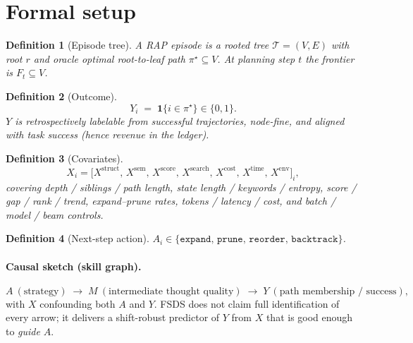 \documentclass[11pt]{article}
\newtheorem{definition}{Definition}
\newcommand{\ind}{\mathbf{1}}
\begin{document}
\section{Formal setup}
\label{sec:formal}

\begin{definition}[Episode tree]
A RAP episode is a rooted tree $\mathcal{T}=(V,E)$ with root $r$ and
oracle optimal root-to-leaf path $\pi^\star\subseteq V$.
At planning step $t$ the frontier is $F_t\subseteq V$.
\end{definition}

\begin{definition}[Outcome]
\begin{equation}
  Y_i \;=\; \ind\{i\in\pi^\star\}\in\{0,1\}.
  \label{eq:Y}
\end{equation}
$Y$ is retrospectively labelable from successful trajectories, node-fine,
and aligned with task success (hence revenue in the ledger).
\end{definition}

\begin{definition}[Covariates]
\begin{equation}
  X_i=\bigl[
    X^{\mathrm{struct}},\,
    X^{\mathrm{sem}},\,
    X^{\mathrm{score}},\,
    X^{\mathrm{search}},\,
    X^{\mathrm{cost}},\,
    X^{\mathrm{time}},\,
    X^{\mathrm{env}}
  \bigr]_i,
\end{equation}
covering depth / siblings / path length, state length / keywords /
entropy, score / gap / rank / trend, expand--prune rates, tokens /
latency / cost, and batch / model / beam controls.
\end{definition}

\begin{definition}[Next-step action]
$A_i\in\{\texttt{expand},\,\texttt{prune},\,\texttt{reorder},\,\texttt{backtrack}\}$.
\end{definition}

\paragraph{Causal sketch (skill graph).}
\[
  A\ (\text{strategy})
  \;\to\;
  M\ (\text{intermediate thought quality})
  \;\to\;
  Y\ (\text{path membership / success}),
\]
with $X$ confounding both $A$ and $Y$. FSDS does not claim full
identification of every arrow; it delivers a shift-robust predictor of
$Y$ from $X$ that is good enough to \emph{guide} $A$.
\end{document}
